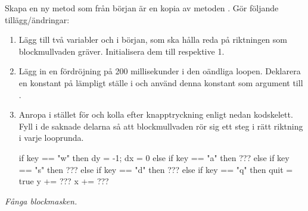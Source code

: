 \Subtask
Skapa en ny metod  som från början är en kopia av metoden . Gör följande tillägg/ändringar:
\begin{enumerate}

\item Lägg till två variabler  och  i början, som ska hålla reda på riktningen som blockmullvaden gräver. Initialisera dem till  respektive {1}.

\item Lägg in en fördröjning på 200 millisekunder i den oändliga loopen. Deklarera en konstant  på lämpligt ställe i  och använd denna konstant som argument till .

\item Anropa  i stället för  och kolla efter knapptryckning enligt nedan kodskelett. Fyll i de saknade delarna så att blockmullvaden rör sig ett steg i rätt riktning i varje looprunda.
\begin{Code}
      if      key == "w" then { dy = -1; dx = 0 }
      else if key == "a" then { ??? }
      else if key == "s" then { ??? }
      else if key == "d" then { ??? }
      else if key == "q" then { quit = true }
      y += ???
      x += ???
\end{Code}


%

\end{enumerate}

\Task\label{lab:blockmole:task:blockworm} \emph{Fånga blockmasken.}


